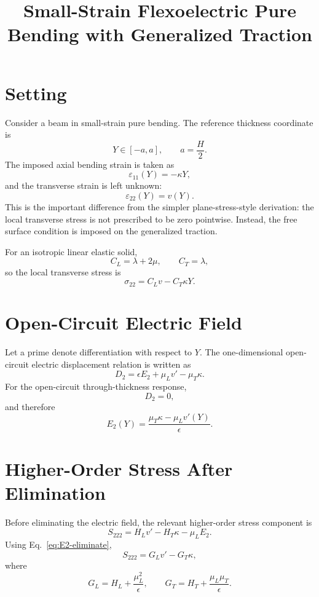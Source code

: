 \documentclass[11pt]{article}
\title{Small-Strain Flexoelectric Pure Bending with Generalized Traction}
\author{}
\date{}
\newcommand{\eps}{\varepsilon}
\begin{document}
\maketitle

\section{Setting}

Consider a beam in small-strain pure bending.  The reference thickness coordinate is
\[
  Y \in [-a,a], \qquad a=\frac{H}{2}.
\]
The imposed axial bending strain is taken as
\[
  \eps_{11}(Y)=-\kappa Y,
\]
and the transverse strain is left unknown:
\[
  \eps_{22}(Y)=v(Y).
\]
This is the important difference from the simpler plane-stress-style derivation: the
local transverse stress is not prescribed to be zero pointwise.  Instead, the free
surface condition is imposed on the generalized traction.

For an isotropic linear elastic solid,
\[
  C_L=\lambda+2\mu, \qquad C_T=\lambda,
\]
so the local transverse stress is
\begin{equation}
  \sigma_{22}=C_L v-C_T\kappa Y .
  \label{eq:sigma22}
\end{equation}

\section{Open-Circuit Electric Field}

Let a prime denote differentiation with respect to \(Y\).  The one-dimensional
open-circuit electric displacement relation is written as
\begin{equation}
  D_2=\epsilon E_2+\mu_L v'-\mu_T\kappa .
  \label{eq:D2}
\end{equation}
For the open-circuit through-thickness response,
\[
  D_2=0,
\]
and therefore
\begin{equation}
  E_2(Y)=\frac{\mu_T\kappa-\mu_L v'(Y)}{\epsilon}.
  \label{eq:E2-eliminate}
\end{equation}

\section{Higher-Order Stress After Elimination}

Before eliminating the electric field, the relevant higher-order stress component is
\begin{equation}
  S_{222}=H_L v'-H_T\kappa-\mu_L E_2 .
\end{equation}
Using Eq.~\eqref{eq:E2-eliminate},
\begin{equation}
  S_{222}=G_L v'-G_T\kappa ,
  \label{eq:S222}
\end{equation}
where
\begin{equation}
  G_L=H_L+\frac{\mu_L^2}{\epsilon},
  \qquad
  G_T=H_T+\frac{\mu_L\mu_T}{\epsilon}.
  \label{eq:G-general}
\end{equation}
\end{document}
